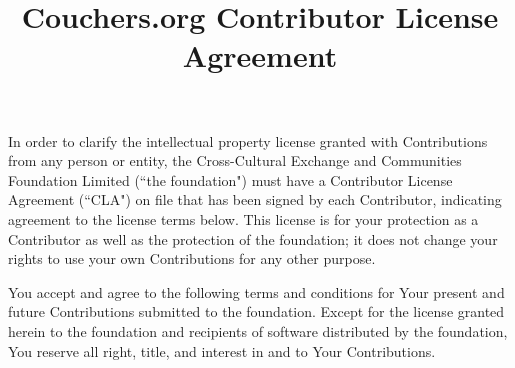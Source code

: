 \documentclass[a4paper]{article}
\begin{document}
\title{Couchers.org Contributor License Agreement}
\date{}
\maketitle

In order to clarify the intellectual property license granted with Contributions from any person or entity, the Cross-Cultural Exchange and Communities Foundation Limited (``the foundation") must have a Contributor License Agreement (``CLA") on file that has been signed by each Contributor, indicating agreement to the license terms below. This license is for your protection as a Contributor as well as the protection of the foundation; it does not change your rights to use your own Contributions for any other purpose.

You accept and agree to the following terms and conditions for Your present and future Contributions submitted to the foundation. Except for the license granted herein to the foundation and recipients of software distributed by the foundation, You reserve all right, title, and interest in and to Your Contributions.
\end{document}
